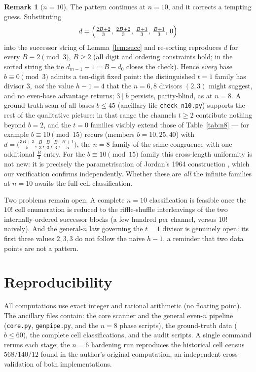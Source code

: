 \documentclass[11pt]{amsart}
\theoremstyle{definition}
\newtheorem{remark}[theorem]{Remark}
\begin{document}
\begin{remark}[$n=10$]\label{rem:n10}
The pattern continues at $n=10$, and it corrects a tempting guess.
Substituting
\[
d=\Bigl(\tfrac{2B+2}{3},\,\tfrac{2B+2}{3},\,\tfrac{B+1}{3},\,
\tfrac{B+1}{3},\,0\Bigr)
\]
into the successor string of Lemma~\ref{lem:succ} and re-sorting
reproduces $d$ for every $B\equiv 2\pmod 3$, $B\ge 2$ (all digit and
ordering constraints hold; in the sorted string the tie
$d_{m-1}-1=B-d_0$ closes the check). Hence \emph{every} base
$b\equiv 0\pmod 3$ admits a ten-digit fixed point: the distinguished
$t=1$ family has divisor $3$, \emph{not} the value $h-1=4$ that the
$n=6,8$ divisors $(2,3)$ might suggest, and no even-base advantage
returns; $3\mid b$ persists, parity-blind, as at $n=8$. A ground-truth
scan of all bases $b\le 45$ (ancillary file \texttt{check\_n10.py})
supports the rest of the qualitative picture: in that range the
channels $t\ge 2$ contribute nothing beyond $b=2$, and the $t=0$
families visibly extend those of Table~\ref{tab:n8} --- for example
$b\equiv 10\pmod{15}$ recurs (members $b=10,25,40$) with
$d=\bigl(\tfrac{3B+3}{5},\tfrac{B}{3},\tfrac{B}{3},\tfrac{B}{3},
\tfrac{B+1}{5}\bigr)$, the $n=8$ family of the same congruence with
one additional $\tfrac{B}{3}$ entry. For the $b\equiv10\pmod{15}$
family this cross-length uniformity is not new: it is precisely the
parametrisation of Jordan's 1964 construction \cite{Jordan64}, which
our verification confirms independently. Whether these are \emph{all}
the infinite families at $n=10$ awaits the full cell classification.
\end{remark}

Two problems remain open. A complete $n=10$ classification is feasible
once the $10!$ cell enumeration is reduced to the riffle-shuffle
interleavings of the two internally-ordered successor blocks (a few
hundred per channel, versus $10!$ naively). And the general-$n$ law
governing the $t=1$ divisor is genuinely open: its first three values
$2,3,3$ do not follow the naive $h-1$, a reminder that two data
points are not a pattern.

\section{Reproducibility}

All computations use exact integer and rational arithmetic (no floating
point). The ancillary files contain: the core scanner and the general
even-$n$ pipeline (\texttt{core.py}, \texttt{genpipe.py}, and the
$n=8$ phase scripts), the ground-truth data ($b\le 60$), the complete
cell classifications, and the audit scripts. A single command reruns
each stage; the $n=6$ hardening run reproduces the historical cell
census $568/140/12$ found in the author's original computation, an
independent cross-validation of both implementations.
\end{document}

